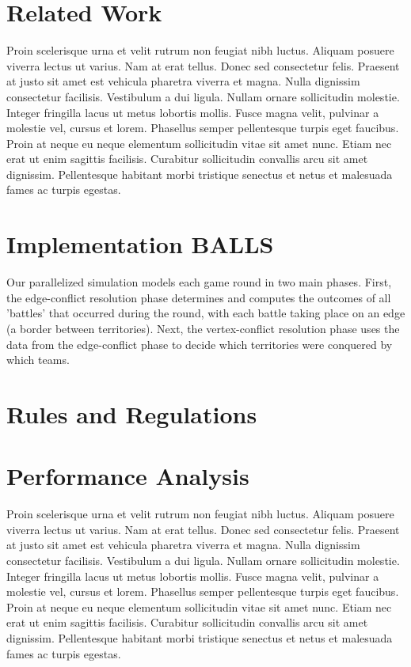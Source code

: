 \documentclass[10pt]{article}
\begin{document}
\begin{multicols}{2}
		\section*{Related Work}
		Proin scelerisque urna et velit rutrum non feugiat nibh luctus. Aliquam posuere viverra lectus ut varius. Nam at erat tellus. Donec sed consectetur felis. Praesent at justo sit amet est vehicula pharetra viverra et magna. Nulla dignissim consectetur facilisis. Vestibulum a dui ligula. Nullam ornare sollicitudin molestie. Integer fringilla lacus ut metus lobortis mollis. Fusce magna velit, pulvinar a molestie vel, cursus et lorem. Phasellus semper pellentesque turpis eget faucibus. Proin at neque eu neque elementum sollicitudin vitae sit amet nunc. Etiam nec erat ut enim sagittis facilisis. Curabitur sollicitudin convallis arcu sit amet dignissim. Pellentesque habitant morbi tristique senectus et netus et malesuada fames ac turpis egestas.

		\section*{Implementation BALLS}
		Our parallelized simulation models each game round in two main phases. 
		First, the edge-conflict resolution phase determines and computes the outcomes of all 'battles' that occurred during the round, with each battle taking place on an edge (a border between territories). 
		Next, the vertex-conflict resolution phase uses the data from the edge-conflict phase to decide which territories were conquered by which teams. 
		
		\section*{Rules and Regulations}
		

		
		
		\section*{Performance Analysis}
		Proin scelerisque urna et velit rutrum non feugiat nibh luctus. Aliquam posuere viverra lectus ut varius. Nam at erat tellus. Donec sed consectetur felis. Praesent at justo sit amet est vehicula pharetra viverra et magna. Nulla dignissim consectetur facilisis. Vestibulum a dui ligula. Nullam ornare sollicitudin molestie. Integer fringilla lacus ut metus lobortis mollis. Fusce magna velit, pulvinar a molestie vel, cursus et lorem. Phasellus semper pellentesque turpis eget faucibus. Proin at neque eu neque elementum sollicitudin vitae sit amet nunc. Etiam nec erat ut enim sagittis facilisis. Curabitur sollicitudin convallis arcu sit amet dignissim. Pellentesque habitant morbi tristique senectus et netus et malesuada fames ac turpis egestas.
		

\end{multicols}
\end{document}
